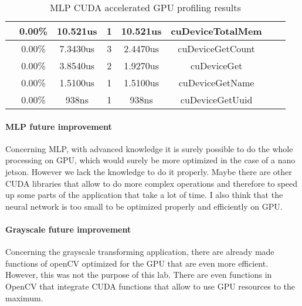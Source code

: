 \documentclass[11pt]{article}
\begin{document}
\begin{table}[h]
\begin{tabular}{|l|c|c|c|c|c|c|c|}
		              & 0.00\%              & 10.521us      & 1              & 10.521us     & cuDeviceTotalMem      \\ \hline
		              & 0.00\%              & 7.3430us      & 3              & 2.4470us     & cuDeviceGetCount      \\ \hline
		              & 0.00\%              & 3.8540us      & 2              & 1.9270us     & cuDeviceGet           \\ \hline
		              & 0.00\%              & 1.5100us      & 1              & 1.5100us     & cuDeviceGetName       \\ \hline
		              & 0.00\%              & 938ns         & 1              & 938ns        & cuDeviceGetUuid       \\ \hline
	\end{tabular}
	\caption{MLP CUDA accelerated GPU profiling results}
	\label{tab:mlp_cuda_profiler}
\end{table}

\paragraph*{MLP future improvement}

Concerning MLP, with advanced knowledge it is surely possible to do the whole processing on GPU, which would surely be more optimized in the case of a nano jetson.
However we lack the knowledge to do it properly. 
Maybe there are other CUDA libraries that allow to do more complex operations and therefore to speed up some parts of the application that take a lot of time. 
I also think that the neural network is too small to be optimized properly and efficiently on GPU. 

\paragraph*{Grayscale future improvement}

Concerning the grayscale transforming application, there are already made functions of openCV optimized for the GPU that are even more efficient. 
However, this was not the purpose of this lab. 
There are even functions in OpenCV that integrate CUDA functions that allow to use GPU resources to the maximum.
\end{document}
